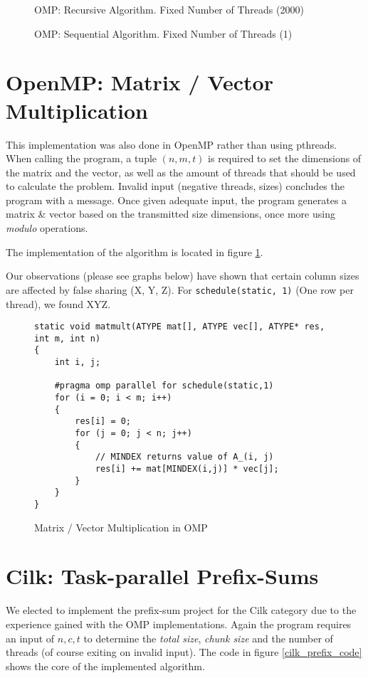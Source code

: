 \documentclass[11pt]{article}
\begin{document}
\begin{figure}
\caption{OMP: Recursive Algorithm. Fixed Number of Threads (2000)}
\end{figure}

\begin{figure}
\caption{OMP: Sequential Algorithm. Fixed Number of Threads (1)}
\end{figure}

\section{OpenMP: Matrix / Vector Multiplication}
This implementation was also done in OpenMP rather than using pthreads. When calling the program, a tuple $(n, m, t)$ is required to set the dimensions of the matrix and the vector, as well as the amount of threads that should be used to calculate the problem. Invalid input (negative threads, sizes) concludes the program with a message.
Once given adequate input, the program generates a matrix \& vector based on the transmitted size dimensions, once more using \emph{modulo} operations.

The implementation of the algorithm is located in figure \ref{omp_matmult_code}.

Our observations (please see graphs below) have shown that certain column sizes are affected by false sharing (X, Y, Z). For \verb=schedule(static, 1)= (One row per thread), we found XYZ.


\begin{figure}
\label{omp_matmult_code}
\caption{Matrix / Vector Multiplication in OMP}
\begin{lstlisting}
static void matmult(ATYPE mat[], ATYPE vec[], ATYPE* res, int m, int n)
{
	int i, j;

	#pragma omp parallel for schedule(static,1)
	for (i = 0; i < m; i++) 
	{
		res[i] = 0;
		for (j = 0; j < n; j++) 
		{
			// MINDEX returns value of A_(i, j)
			res[i] += mat[MINDEX(i,j)] * vec[j];
		}
	}
}
\end{lstlisting}
\end{figure}



\section{Cilk: Task-parallel Prefix-Sums}
We elected to implement the prefix-sum project for the Cilk category due to the experience gained with the OMP implementations. Again the program requires an input of $n, c, t$ to determine the \emph{total size}, \emph{chunk size} and the number of threads (of course exiting on invalid input). The code in figure \ref{cilk_prefix_code} shows the core of the implemented algorithm.
\end{document}
